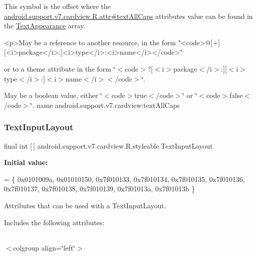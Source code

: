 This symbol is the offset where the \hyperlink{classandroid_1_1support_1_1v7_1_1cardview_1_1R_1_1attr_a319eca13d313e050d22fac372aa21425}{android.\+support.\+v7.\+cardview.\+R.\+attr\#text\+All\+Caps} attribute\textquotesingle{}s value can be found in the \hyperlink{classandroid_1_1support_1_1v7_1_1cardview_1_1R_1_1styleable_aac90085e3889272ab1a7da34a6c5ed38}{Text\+Appearance} array.

\begin{DoxyVerb}      <p>May be a reference to another resource, in the form "<code>@[+][<i>package</i>:]<i>type</i>:<i>name</i></code>"
\end{DoxyVerb}
 or to a theme attribute in the form \char`\"{}$<$code$>$?\mbox{[}$<$i$>$package$<$/i$>$\+:\mbox{]}\mbox{[}$<$i$>$type$<$/i$>$\+:\mbox{]}$<$i$>$name$<$/i$>$$<$/code$>$\char`\"{}. 

May be a boolean value, either \char`\"{}$<$code$>$true$<$/code$>$\char`\"{} or \char`\"{}$<$code$>$false$<$/code$>$\char`\"{}.  name android.\+support.\+v7.\+cardview\+:text\+All\+Caps \mbox{\label{classandroid_1_1support_1_1v7_1_1cardview_1_1R_1_1styleable_a9b23c31ffaf354f0f5cc4b82392ef6a4}} 
\subsubsection{\texorpdfstring{Text\+Input\+Layout}{TextInputLayout}}
{\footnotesize\ttfamily final int \mbox{[}$\,$\mbox{]} android.\+support.\+v7.\+cardview.\+R.\+styleable.\+Text\+Input\+Layout\hspace{0.3cm}{\ttfamily [static]}}

{\bfseries Initial value\+:}
\begin{DoxyCode}
= \{
            0x0101009a, 0x01010150, 0x7f010133, 0x7f010134,
            0x7f010135, 0x7f010136, 0x7f010137, 0x7f010138,
            0x7f010139, 0x7f01013a, 0x7f01013b
        \}
\end{DoxyCode}
Attributes that can be used with a Text\+Input\+Layout. 

Includes the following attributes\+:

\tabulinesep=1mm
\begin{longtabu} spread 0pt [c]{*{0}{|X[-1]}|}
\hline
\end{longtabu}
$<$colgroup align=\char`\"{}left\char`\"{}$>$ 

